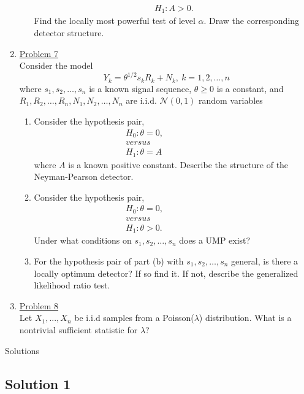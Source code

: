 \documentclass[a4paper,english,12pt]{article}
\begin{document}
\begin{enumerate}
\begin{enumerate}
\begin{gather*}
H_1: A>0.
\end{gather*}
Find the locally most powerful test of level $\alpha$. Draw the corresponding detector structure.
\end{enumerate}
\item  \hyperlink{solution7}{Problem 7}\\
Consider the model
\begin{equation}
Y_k=\theta^{1/2} s_kR_k+N_k,~k=1,2,\dots,n
\end{equation}
where $s_1,s_2,\dots,s_n$ is a known signal sequence, $\theta\geq0$ is a constant, and $R_1,R_2,\dots,R_n,N_1,N_2,\dots,N_n$ are i.i.d. $\mathcal{N}(0,1)$ random variables
\begin{enumerate}
\item Consider the hypothesis pair,
\begin{gather*}
H_0: \theta=0,\\
versus\hspace{100pt}\\
H_1: \theta=A
\end{gather*}
where $A$ is a known positive constant. Describe the structure of the Neyman-Pearson detector.
\item Consider the hypothesis pair,
\begin{gather*}
H_0: \theta=0,\\
versus\hspace{100pt}\\
H_1: \theta>0.
\end{gather*}
Under what conditions on $s_1,s_2,\dots,s_n$ does a UMP exist?
\item For the hypothesis pair of part (b) with $s_1,s_2,\dots,s_n$ general, is there a locally optimum detector? If so find it. If not, describe the generalized likelihood ratio test.
\end{enumerate}
\item \hyperlink{solution8}{Problem 8}\\
Let $X_1, ..., X_n$ be i.i.d samples from a Poisson($\lambda$) distribution. What is a nontrivial sufficient statistic for $\lambda$?
\end{enumerate}

\newpage
\par{\centering\Large {Solutions}\par}
\hypertarget{solution1}{\subsection*{Solution 1}}
\end{document}
